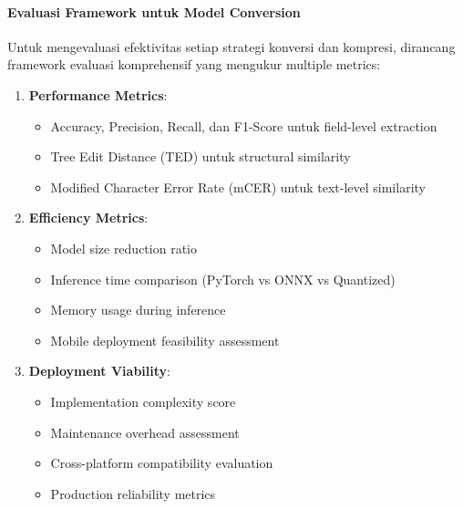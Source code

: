 \paragraph{Evaluasi Framework untuk Model Conversion}
Untuk mengevaluasi efektivitas setiap strategi konversi dan kompresi, dirancang framework evaluasi komprehensif yang mengukur multiple metrics:

\begin{enumerate}
    \item \textbf{Performance Metrics}:
    \begin{itemize}
        \item Accuracy, Precision, Recall, dan F1-Score untuk field-level extraction
        \item Tree Edit Distance (TED) untuk structural similarity
        \item Modified Character Error Rate (mCER) untuk text-level similarity
    \end{itemize}
    
    \item \textbf{Efficiency Metrics}:
    \begin{itemize}
        \item Model size reduction ratio
        \item Inference time comparison (PyTorch vs ONNX vs Quantized)
        \item Memory usage during inference
        \item Mobile deployment feasibility assessment
    \end{itemize}
    
    \item \textbf{Deployment Viability}:
    \begin{itemize}
        \item Implementation complexity score
        \item Maintenance overhead assessment  
        \item Cross-platform compatibility evaluation
        \item Production reliability metrics
    \end{itemize}
\end{enumerate}
